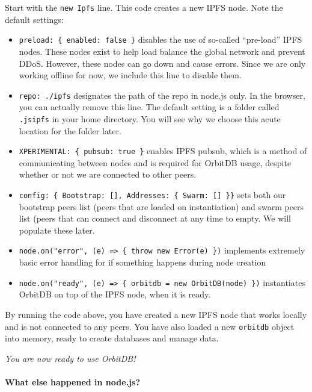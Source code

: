 Start with the \texttt{new\ Ipfs} line. This code creates a new IPFS
node. Note the default settings:

\begin{itemize}
\tightlist
\item
  \texttt{preload:\ \{\ enabled:\ false\ \}} disables the use of
  so-called ``pre-load'' IPFS nodes. These nodes exist to help load
  balance the global network and prevent DDoS. However, these nodes can
  go down and cause errors. Since we are only working offline for now,
  we include this line to disable them.
\item
  \texttt{repo:\ \textquotesingle{}./ipfs\textquotesingle{}} designates
  the path of the repo in node.js only. In the browser, you can actually
  remove this line. The default setting is a folder called
  \texttt{.jsipfs} in your home directory. You will see why we choose
  this acute location for the folder later.
\item
  \texttt{XPERIMENTAL:\ \{\ pubsub:\ true\ \}} enables IPFS pubsub,
  which is a method of communicating between nodes and is required for
  OrbitDB usage, despite whether or not we are connected to other peers.
\item
  \texttt{config:\ \{\ Bootstrap:\ {[}{]},\ Addresses:\ \{\ Swarm:\ {[}{]}\ \}\}}
  sets both our bootstrap peers list (peers that are loaded on
  instantiation) and swarm peers list (peers that can connect and
  disconnect at any time to empty. We will populate these later.
\item
  \texttt{node.on("error",\ (e)\ =\textgreater{}\ \{\ throw\ new\ Error(e)\ \})}
  implements extremely basic error handling for if something happens
  during node creation
\item
  \texttt{node.on("ready",\ (e)\ =\textgreater{}\ \{\ orbitdb\ =\ new\ OrbitDB(node)\ \})}
  instantiates OrbitDB on top of the IPFS node, when it is ready.
\end{itemize}

By running the code above, you have created a new IPFS node that works
locally and is not connected to any peers. You have also loaded a new
\texttt{orbitdb} object into memory, ready to create databases and
manage data.

\emph{You are now ready to use OrbitDB!}

\paragraph{What else happened in
node.js?}\label{what-else-happened-in-node.js-2}

